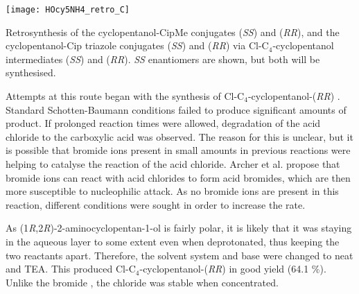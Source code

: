 \begin{scheme}[H]
	\begin{center}
		\texttt{[image: HOcy5NH4\_retro\_C]}
		\caption{Retrosynthesis of the cyclopentanol-CipMe conjugates 
		 (\textit{SS}) and
		 (\textit{RR}), 
		and the cyclopentanol-Cip triazole conjugates 
		 (\textit{SS}) and
		 (\textit{RR})  
		via Cl-C$_4$-cyclopentanol intermediates 
		 (\textit{SS}) and 
		 (\textit{RR}). 
		\textit{SS} enantiomers are shown, but both will be synthesised.
		\label{sch:HOcy5NH4_retro_C}}
	\end{center}
\end{scheme}

Attempts at this route began with the synthesis of Cl-C$_4$-cyclopentanol-(\textit{RR}) . Standard Schotten-Baumann conditions failed to produce significant amounts of product. If prolonged reaction times were allowed, degradation of the acid chloride to the carboxylic acid was observed. The reason for this is unclear, but it is possible that bromide ions present in small amounts in previous reactions were helping to catalyse the reaction of the acid chloride. Archer et al.\cite{Archer1953} propose that bromide ions can react with acid chlorides to form acid bromides, which are then more susceptible to nucleophilic attack.
As no bromide ions are present in this reaction, different conditions were sought in order to increase the rate.

As (1\textit{R},2\textit{R})-2-aminocyclopentan-1-ol  is fairly polar, it is likely that it was staying in the aqueous layer to some extent even when deprotonated, thus keeping the two reactants apart.
Therefore, the solvent system and base were changed to neat  and TEA.
This produced Cl-C$_4$-cyclopentanol-(\textit{RR})  in good yield (64.1 \%). Unlike the bromide , the chloride  was stable when concentrated.

